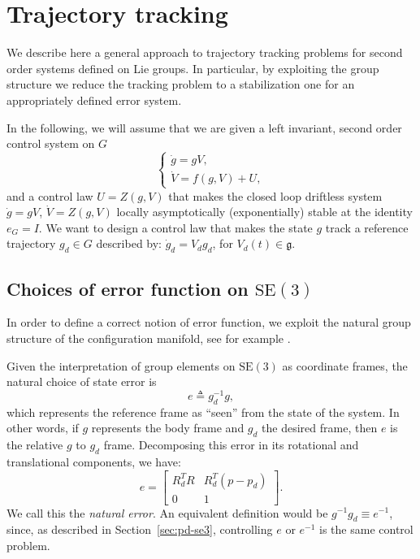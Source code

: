 \documentclass[11pt]{article}
\newcommand{\SE}{\mathrm{SE}}
\newcommand{\gfrak}{\mathfrak g}
\begin{document}
\section{Trajectory tracking}\label{sec:trajectory-tracking}
We describe here a general approach to trajectory tracking problems for second order systems defined on Lie groups. In particular, by exploiting the group structure we reduce the tracking problem to a stabilization one for an appropriately defined error system.

In the following, we will assume that we are given a left invariant, second order control system on $G$
\begin{equation*}
\begin{cases}
\dot g=gV,\\
\dot V=f(g,V)+U,
\end{cases}\tag{5.1}\label{eq:5.1}
\end{equation*}
and a control law $U=Z(g,V)$ that makes the closed loop driftless system $\dot g=gV$, $\dot V=Z(g,V)$ locally asymptotically (exponentially) stable at the identity $e_G=I$. We want to design a control law that makes the state $g$ track a reference trajectory $g_d\in G$ described by: $\dot g_d=V_dg_d$, for $V_d(t)\in\gfrak$.

\subsection{Choices of error function on $\SE(3)$}\label{subsec:error-functions-se3}
In order to define a correct notion of error function, we exploit the natural group structure of the configuration manifold, see for example \cite{34}.

Given the interpretation of group elements on $\SE(3)$ as coordinate frames, the natural choice of state error is
\begin{equation*}
e\triangleq g_d^{-1}g,
\end{equation*}
which represents the reference frame as ``seen'' from the state of the system. In other words, if $g$ represents the body frame and $g_d$ the desired frame, then $e$ is the relative $g$ to $g_d$ frame. Decomposing this error in its rotational and translational components, we have:
\begin{equation*}
e=\begin{bmatrix}R_d^TR&R_d^T(p-p_d)\\0&1\end{bmatrix}.\tag{5.2}\label{eq:5.2}
\end{equation*}
We call this the \emph{natural error}. An equivalent definition would be $g^{-1}g_d\equiv e^{-1}$, since, as described in Section~\ref{sec:pd-se3}, controlling $e$ or $e^{-1}$ is the same control problem.
\end{document}
